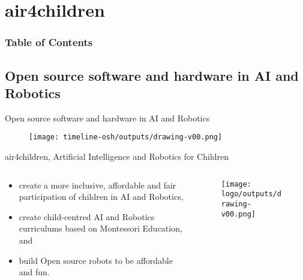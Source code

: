 \section{air4children}


\begin{frame}
      \frametitle{Table of Contents}
      \tableofcontents[currentsection]
\end{frame}


\subsection{Open source software and hardware in AI and Robotics}

{
\begin{frame}{Open source software and hardware in AI and Robotics}

      \begin{figure}
        \centering
        \texttt{[image: timeline-osh/outputs/drawing-v00.png]}
      \end{figure}
\end{frame}
}

{
\begin{frame}{
air4children, Artificial Intelligence and Robotics for Children
}
 
  \begin{columns}
  \begin{column}{.7\linewidth}

  \begin{itemize}
    \item create a more inclusive, affordable and fair participation of children in AI and Robotics,
    \item create child-centred AI and Robotics curriculums based on Montessori Education, and
    \item build Open source robots to be affordable and fun. 
  \end{itemize}

    \end{column}


  \begin{column}{.4\linewidth}

      \begin{figure}
        \centering
        \texttt{[image: logo/outputs/drawing-v00.png]}
      \end{figure}

    \end{column}
  \end{columns}

\end{frame}
}




